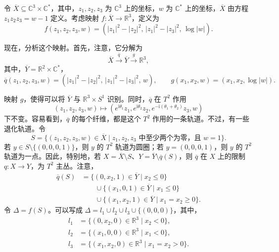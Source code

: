 \begin{construction}\label{constr:6.92}
令 $\overline X\subseteq\mathbb C^3\times\mathbb C^*$，其中，$z_1,z_2,z_3$ 为 $\mathbb C^3$ 上的坐标，$w$ 为 $\mathbb C^*$ 上的坐标，$\overline X$ 由方程 $z_1z_2z_3=w-1$ 定义。考虑映射 $f\colon\overline X\to\mathbb R^3$，定义为
\[
f(z_1,z_2,z_3,w)=(|z_1|^2-|z_2|^2,\,|z_1|^2-|z_3|^2,\,\log|w|).
\]

现在，分析这个映射。首先，注意，它分解为
\[
\overline X\xrightarrow{\overline q}\overline Y\xrightarrow{g}\mathbb R^3,
\]
其中，$\overline Y=\mathbb R^2\times\mathbb C^*$，
\[
\overline q(z_1,z_2,z_3,w)=(|z_1|^2-|z_2|^2,\,|z_1|^2-|z_3|^2,\,w),
\qquad
g(x_1,x_2,w)=(x_1,x_2,\log|w|).
\]

映射 $g$，使得可以将 $\overline Y$ 与 $\mathbb R^3\times S^1$ 识别。同时，$\overline q$ 在 $T^2$ 作用
\[
(z_1,z_2,z_3,w)\longmapsto
(e^{\mathrm i\theta_1}z_1,e^{\mathrm i\theta_2}z_2,
 e^{-\mathrm i(\theta_1+\theta_2)}z_3,w)
\]
下不变。容易看到，$\overline q$ 的每个纤维，都是这个 $T^2$ 作用的一条轨道。不过，有一些退化轨道。令
\[
S=\{(z_1,z_2,z_3,w)\in\overline X\mid
z_1,z_2,z_3\text{ 中至少两个为零，且 }w=1\}.
\]
若 $y\in S\setminus\{(0,0,0,1)\}$，则 $y$ 的 $T^2$ 轨道为圆圈；若 $y=(0,0,0,1)$，则 $y$ 的 $T^2$ 轨道为一点。因此，特别地，若 $X=\overline X\setminus S$、$Y=\overline Y\setminus\overline q(S)$，则 $\overline q$ 在 $X$ 上的限制 $q\colon X\to Y$，为 $T^2$ 主丛。注意，
\[
\begin{aligned}
\overline q(S)
&=\{(0,x_2,1)\in\overline Y\mid x_2\leq0\}\\
&\qquad\cup\{(x_1,0,1)\in\overline Y\mid x_1\leq0\}\\
&\qquad\cup\{(x_1,x_2,1)\in\overline Y\mid x_1=x_2\geq0\}.
\end{aligned}
\]
令 $\Delta=f(S)$。可以写成 $\Delta=l_1\cup l_2\cup l_3\cup\{(0,0,0)\}$，其中，
\[
\begin{aligned}
l_1&=\{(0,x_2,0)\in\mathbb R^3\mid x_2<0\},\\
l_2&=\{(x_1,0,0)\in\mathbb R^3\mid x_1<0\},\\
l_3&=\{(x_1,x_2,0)\in\mathbb R^3\mid x_1=x_2>0\}.
\end{aligned}
\]


\end{construction}
